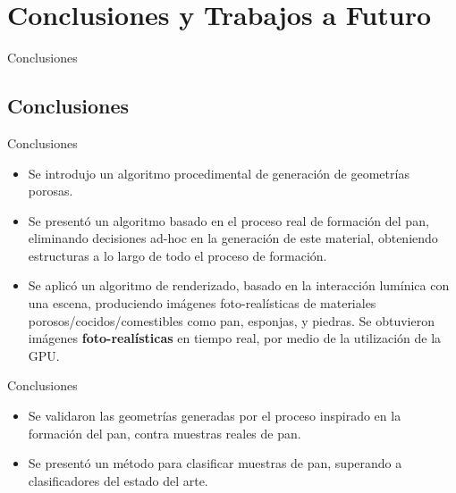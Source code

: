 \documentclass[spanish]{beamer}
\begin{document}
\section[Conclusiones]{Conclusiones y Trabajos a Futuro}


\begin{frame}
\begin{block}{}
\begin{center}
\vspace{1cm}
\huge{Conclusiones}
\vspace{1cm}
\end{center}
\end{block}
\end{frame}

\subsection{Conclusiones}
\begin{frame}{Conclusiones}
\begin{block}{}
\begin{itemize}
\item Se introdujo un algoritmo procedimental de generación de geometrías porosas.
\item Se presentó un algoritmo basado en el proceso real de formación del pan, eliminando decisiones ad-hoc en la generación de este material, obteniendo estructuras a lo largo de todo el proceso de formación.
\item Se aplicó un algoritmo de renderizado, basado en la interacción lumínica con una escena, produciendo imágenes foto-realísticas de materiales porosos/cocidos/comestibles como pan, esponjas, y piedras. Se obtuvieron imágenes \textbf{foto-realísticas} en tiempo real, por medio de la utilización de la GPU.
\end{itemize}
\end{block}
\end{frame}

\begin{frame}{Conclusiones}
\begin{block}{}
\begin{itemize}
\item Se validaron las geometrías generadas por el proceso inspirado en la formación del pan, contra muestras reales de pan.
\item Se presentó un método para clasificar muestras de pan, superando a clasificadores del estado del arte.
\end{itemize}
\end{block}
\end{frame}
\end{document}
